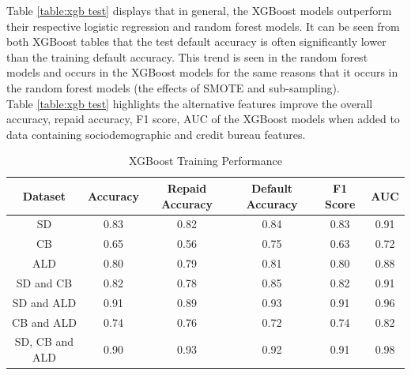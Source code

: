 Table \ref{table:xgb test} displays that in general, the XGBoost models outperform their respective logistic regression and random forest models. It can be seen from both XGBoost tables that the test default accuracy is often significantly lower than the training default accuracy. This trend is seen in the random forest models and occurs in the XGBoost models for the same reasons that it occurs in the random forest models (the effects of SMOTE and sub-sampling). \\ 

Table \ref{table:xgb test} highlights the alternative features improve the overall accuracy, repaid accuracy, F1 score, AUC of the XGBoost models when added to data containing sociodemographic and credit bureau features. 

\vspace{10pt}

\begin{table}[H]
\begin{center}
\begin{tabular}{|c|c|c|c|c|c|} 
\hline
\multicolumn{1}{|c|}{Dataset}
&\multicolumn{1}{|c|}{Accuracy}
&\multicolumn{1}{|c|}{Repaid Accuracy}
&\multicolumn{1}{|c|}{Default Accuracy}
&\multicolumn{1}{|c|}{F1 Score}
&\multicolumn{1}{|c|}{AUC}\\
\hline
SD & 0.83 & 0.82 & 0.84 & 0.83 & 0.91    \\
\hline
CB & 0.65 & 0.56 & 0.75 & 0.63 & 0.72    \\
\hline
ALD & 0.80 & 0.79 & 0.81 & 0.80 & 0.88    \\
\hline
SD and CB & 0.82 & 0.78 & 0.85 & 0.82 & 0.91    \\
\hline
SD and ALD & 0.91 & 0.89 & 0.93 & 0.91 & 0.96    \\
\hline
CB and ALD & 0.74 & 0.76 & 0.72 & 0.74 & 0.82    \\
\hline
SD, CB and ALD & 0.90 & 0.93 & 0.92 & 0.91 & 0.98    \\
\hline
\end{tabular}
\end{center}
\caption{XGBoost Training Performance}
\label{table:xgb training}
\end{table}

\vspace{10pt}

